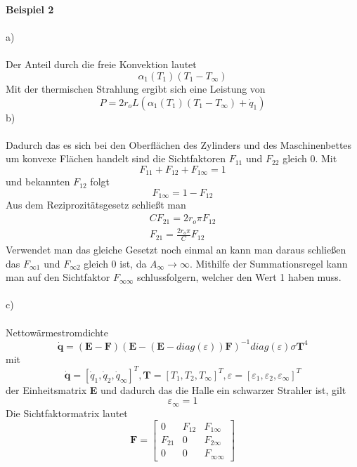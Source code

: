 \newpage
\noindent
\textbf{Beispiel 2} \\ \\
a)\\ \\
Der Anteil durch die freie Konvektion lautet
\[
	\alpha_1(T_1)(T_1 - T_\infty)
\]
Mit der thermischen Strahlung  ergibt sich eine Leistung von
\[
	P = 2r_oL(\alpha_1(T_1)(T_1 - T_\infty) + \dot{q}_1)
\]
b) \\ \\
Dadurch das es sich bei den Oberflächen des Zylinders und des Maschinenbettes um konvexe Flächen handelt sind die Sichtfaktoren $F_{11}$ und $F_{22}$ gleich 0. Mit 
\[
	F_{11} + F_{12} + F_{1\infty} = 1
\]
und bekannten $F_{12}$ folgt
\[
	F_{1\infty} = 1 - F_{12}
\]
Aus dem Reziprozitätsgesetz schließt man
\begin{align*}
	CF_{21} = 2r_o\pi F_{12} \\
	F_{21} = \frac{2r_o\pi}{C}F_{12}
\end{align*}
Verwendet man das gleiche Gesetzt noch einmal an kann man daraus schließen das $F_{\infty1}$ und $F_{\infty2}$ gleich 0 ist, da $A_\infty \rightarrow \infty$. Mithilfe der Summationsregel kann man auf den Sichtfaktor $F_{\infty \infty}$ schlussfolgern, welcher den Wert 1 haben muss.\\ \\
c) \\ \\
Nettowärmestromdichte
\[
	\dot{\textbf{q}} = (\textbf{E} - \textbf{F})(\textbf{E} - (\textbf{E} - diag (\varepsilon))\textbf{F})^{-1}diag(\varepsilon)\sigma\textbf{T}^4
\]
mit
\[
	\dot{\textbf{q}} = [\dot{q}_1,\dot{q}_2,\dot{q}_\infty]^T , \textbf{T} = [T_1,T_2,T_\infty]^T, \varepsilon = [\varepsilon_1,\varepsilon_2,\varepsilon_\infty]^T
\]
der Einheitsmatrix \textbf{E} und dadurch das die Halle ein schwarzer Strahler ist, gilt
\[
	\varepsilon_\infty = 1
\]
Die Sichtfaktormatrix lautet
\[
	\textbf{F} = \begin{bmatrix}
	0 & F_{12} & F_{1\infty} \\
	F_{21} & 0 & F_{2\infty} \\
	0 & 0 & F_{\infty \infty}
	\end{bmatrix}
\]